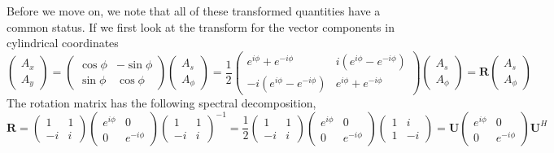 Before we move on, we note that all of these transformed quantities have a common status.
If we first look at the transform for the vector components in cylindrical coordinates
\[
    \begin{pmatrix} A_x \\ A_y \end{pmatrix} = 
    \begin{pmatrix}
        \cos\phi & -\sin\phi \\ 
        \sin\phi & \cos\phi 
    \end{pmatrix} \begin{pmatrix} A_s \\ A_\phi \end{pmatrix} = \frac{1}{2}
    \begin{pmatrix}
        e^{i\phi} + e^{-i\phi} & i \left(e^{i\phi} - e^{-i\phi}\right) \\ 
        - i \left(e^{i\phi} - e^{-i\phi}\right) & e^{i\phi} + e^{-i\phi}
    \end{pmatrix} \begin{pmatrix} A_s \\ A_\phi \end{pmatrix} = \mathbf{R} \begin{pmatrix} A_s \\ A_\phi \end{pmatrix}
\]
The rotation matrix has the following spectral decomposition,
\[
    \mathbf{R} =
    \begin{pmatrix} 1 & 1 \\ -i & i \end{pmatrix}
    \begin{pmatrix} e^{i\phi} & 0 \\ 0 & e^{-i\phi} \end{pmatrix}
    \begin{pmatrix} 1 & 1 \\ -i & i \end{pmatrix}^{-1} = \frac{1}{2}
    \begin{pmatrix} 1 & 1 \\ -i & i \end{pmatrix}
    \begin{pmatrix} e^{i\phi} & 0 \\ 0 & e^{-i\phi} \end{pmatrix}
    \begin{pmatrix} 1 & i \\ 1 & -i \end{pmatrix} = \mathbf{U} \begin{pmatrix} e^{i\phi} & 0 \\ 0 & e^{-i\phi} \end{pmatrix} \mathbf{U}^H
\]
